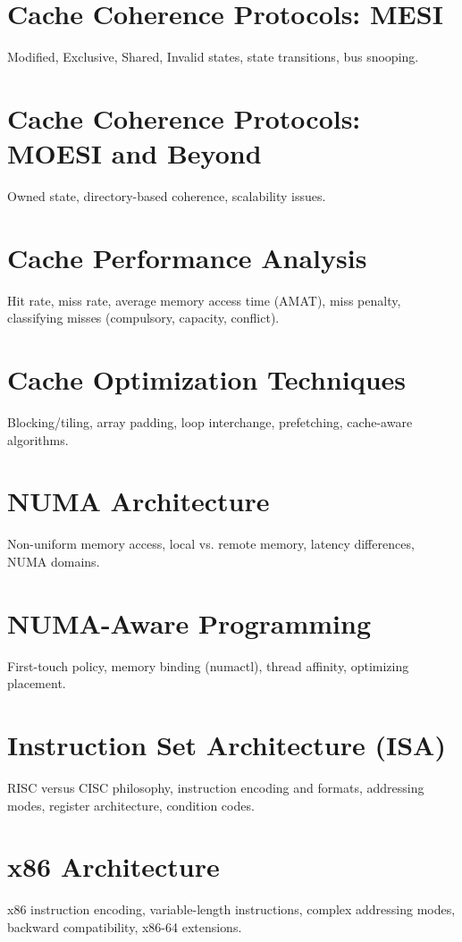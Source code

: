 \chapter{Cache Coherence Protocols: MESI}
Modified, Exclusive, Shared, Invalid states, state transitions, bus snooping.

\chapter{Cache Coherence Protocols: MOESI and Beyond}
Owned state, directory-based coherence, scalability issues.

\chapter{Cache Performance Analysis}
Hit rate, miss rate, average memory access time (AMAT), miss penalty, classifying misses (compulsory, capacity, conflict).

\chapter{Cache Optimization Techniques}
Blocking/tiling, array padding, loop interchange, prefetching, cache-aware algorithms.

\chapter{NUMA Architecture}
Non-uniform memory access, local vs. remote memory, latency differences, NUMA domains.

\chapter{NUMA-Aware Programming}
First-touch policy, memory binding (numactl), thread affinity, optimizing placement.


\chapter{Instruction Set Architecture (ISA)}
RISC versus CISC philosophy, instruction encoding and formats, addressing modes, register architecture, condition codes.

\chapter{x86 Architecture}
x86 instruction encoding, variable-length instructions, complex addressing modes, backward compatibility, x86-64 extensions.

